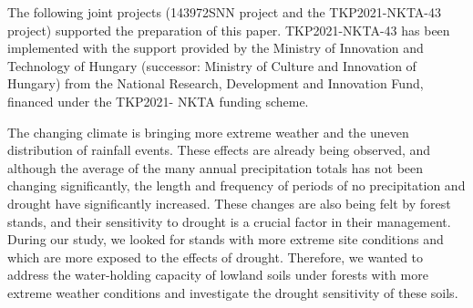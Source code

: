 The following joint projects (143972SNN project and the TKP2021-NKTA-43 project) supported the preparation of this paper. TKP2021-NKTA-43 has been implemented with the support provided by the Ministry of Innovation and Technology of Hungary (successor: Ministry of Culture and Innovation of Hungary) from the National Research, Development and Innovation Fund, financed under the TKP2021- NKTA funding scheme.





\newpage{}
{}
\begin{flushleft}





\end{flushleft}

\noindent

The changing climate is bringing more extreme weather and the uneven distribution of rainfall events. These effects are already being observed, and although the average of the many annual precipitation totals has not been changing significantly, the length and frequency of periods of no precipitation and drought have significantly increased. These changes are also being felt by forest stands, and their sensitivity to drought is a crucial factor in their management. During our study, we looked for stands with more extreme site conditions and which are more exposed to the effects of drought. Therefore, we wanted to address the water-holding capacity of lowland soils under forests with more extreme weather conditions and investigate the drought sensitivity of these soils.

